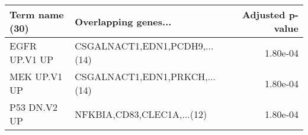 \begin{tabular}{llr}
\toprule
Term name (30) &          Overlapping genes... &  Adjusted p-value \\
\midrule
 EGFR UP.V1 UP & CSGALNACT1,EDN1,PCDH9,...(14) &          1.80e-04 \\
  MEK UP.V1 UP & CSGALNACT1,EDN1,PRKCH,...(14) &          1.80e-04 \\
  P53 DN.V2 UP &    NFKBIA,CD83,CLEC1A,...(12) &          1.80e-04 \\
\bottomrule
\end{tabular}
